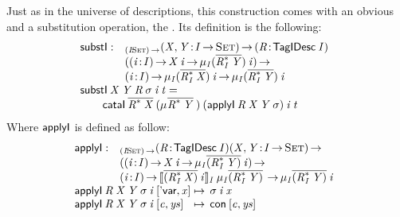 \newcommand{\substI}{\F{substI}}


Just as in the universe of descriptions, this construction comes with
an obvious \return and a substitution operation, the \bind. Its
definition is the following:
%
\[\stk{
\begin{array}{@{}ll}
\substI : & _{\PI{\V{I}}{\Set}}
            \PI{\V{X}, \V{Y}}{\V{I} \To \Set}
            \PITEL{\V{R}}{\TagIDesc{\V{I}}} \\
          & (\PI{\V{i}}{\V{I}} \V{X}\:\V{i} \To 
                               \IMu{\V{I}}{(\toIDesc{\FreeIMonad{\V{R}}{\V{I}}{\V{Y}}})}{\V{i}}) \To \\
          & \PI{\V{i}}{\V{I}}
            \IMu{\V{I}}{(\toIDesc{\FreeIMonad{\V{R}}{\V{I}}{\V{X}}})}{\V{i}} \To
            \IMu{\V{I}}{(\toIDesc{\FreeIMonad{\V{R}}{\V{I}}{\V{Y}}})}{\V{i}}
\end{array} \\
\substI\: \V{X}\: \V{Y}\: \V{R}\: \V{\sigma}\: \V{i}\: \V{t} = \\
\qquad    \cataI\: \toIDesc{\FreeIMonad{\V{R}}{}{\V{X}}}\:
                      (\IMu{}{\toIDesc{\FreeIMonad{\V{R}}{}{\V{Y}}}})\:
                      (\F{applyI}\: \V{R}\: \V{X}\: \V{Y}\: \V{\sigma})\:
                      \V{i}\:
                      \V{t} 
}\]
% 
Where  $\F{applyI}$ is defined as follow:
%
\[\stk{
\begin{array}{@{}ll}
\F{applyI} : & _{\PI{\V{I}}{\Set}}
            \PITEL{\V{R}}{\TagIDesc{\V{I}}}
            \PI{\V{X}, \V{Y}}{\V{I} \To \Set} \\
          & (\PI{\V{i}}{\V{I}} \V{X}\: \V{i} \To \IMu{\V{I}}{\toIDesc{(\FreeIMonad{\V{R}}{\V{I}}{\V{Y}})}}{\V{i}}) \To \\
          & \PI{\V{i}}{\V{I}} 
            \idescop{\toIDesc{(\FreeIMonad{\V{R}}
                                         {\V{I}}
                                         {\V{X}})}\: 
                     \V{i}}
                    {\V{I}}
{\IMu{\V{I}}{\toIDesc{(\FreeIMonad{\V{R}}{\V{I}}{\V{Y}})}}} \To 
           \IMu{\V{I}}{\toIDesc{(\FreeIMonad{\V{R}}{\V{I}}{\V{Y}})}}{\V{i}}
\end{array} \\
\begin{array}{@{}l@{\:\mapsto\:\:}l}
\F{applyI}\: \V{R}\: \V{X}\: \V{Y}\: \V{\sigma}\: \V{i}\: \pair{\SYMBDVar}{\V{x}}{}   & \V{\sigma}\: \V{i}\: \V{x}                   \\
\F{applyI}\: \V{R}\: \V{X}\: \V{Y}\: \V{\sigma}\: \V{i}\: \pair{\V{c}}{\V{ys}}{} & \Con{\pair{\V{c}}{\V{ys}}{}}
\end{array}
}\]
 
